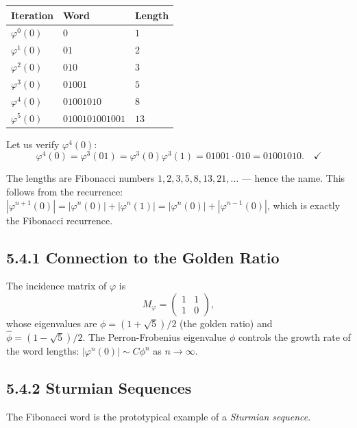\begin{example}

\begin{tabular}{|l|l|l|}
\hline
Iteration & Word & Length \\
\hline
$\varphi^0(0)$ & $0$ & $1$ \\
$\varphi^1(0)$ & $01$ & $2$ \\
$\varphi^2(0)$ & $010$ & $3$ \\
$\varphi^3(0)$ & $01001$ & $5$ \\
$\varphi^4(0)$ & $01001010$ & $8$ \\
$\varphi^5(0)$ & $0100101001001$ & $13$ \\
\hline
\end{tabular}


Let us verify $\varphi^4(0)$:
\[
\varphi^4(0) = \varphi^3(01) = \varphi^3(0)\varphi^3(1) = 01001 \cdot 010 = 01001010. \quad\checkmark
\]

The lengths are Fibonacci numbers $1, 2, 3, 5, 8, 13, 21, \ldots$ --- hence the name. This follows from the recurrence: $|\varphi^{n+1}(0)| = |\varphi^n(0)| + |\varphi^n(1)| = |\varphi^n(0)| + |\varphi^{n-1}(0)|$, which is exactly the Fibonacci recurrence.
\end{example}

\subsection{5.4.1 Connection to the Golden Ratio}

The incidence matrix of $\varphi$ is
\[
M_\varphi = \begin{pmatrix} 1 & 1 \\ 1 & 0 \end{pmatrix},
\]
whose eigenvalues are $\phi = (1+\sqrt{5})/2$ (the golden ratio) and $\hat{\phi} = (1-\sqrt{5})/2$. The Perron-Frobenius eigenvalue $\phi$ controls the growth rate of the word lengths: $|\varphi^n(0)| \sim C \phi^n$ as $n \to \infty$.

\subsection{5.4.2 Sturmian Sequences}

The Fibonacci word is the prototypical example of a \textit{Sturmian sequence}.

